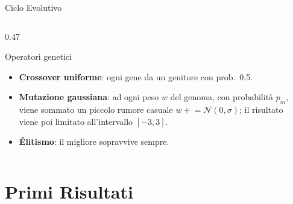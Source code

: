 \documentclass[9pt,serif,usenames,dvipsnames]{beamer}
\begin{document}
\begin{frame}{\centering Ciclo Evolutivo}
\begin{columns}[T]
\begin{column}{0.47\textwidth}
				\vspace{0.1cm}
				\begin{block}{Operatori genetici}
					\footnotesize
					\begin{itemize}
						\setlength{\itemsep}{2pt}
						\item \textbf{Crossover uniforme}: ogni gene da un genitore
						con prob.\ 0.5.
						\item \textbf{Mutazione gaussiana}: ad ogni peso $w$ del genoma,
						con probabilità $p_m$, viene sommato un piccolo rumore casuale
						$w \mathrel{+}= \mathcal{N}(0,\sigma)$; il risultato \\ viene
						poi limitato all'intervallo $[-3, 3]$.
						\item \textbf{Élitismo}: il migliore sopravvive sempre.
					\end{itemize}
				\end{block}
			\end{column}
		\end{columns}
	\end{frame}

	\section{Primi Risultati}
\end{document}
